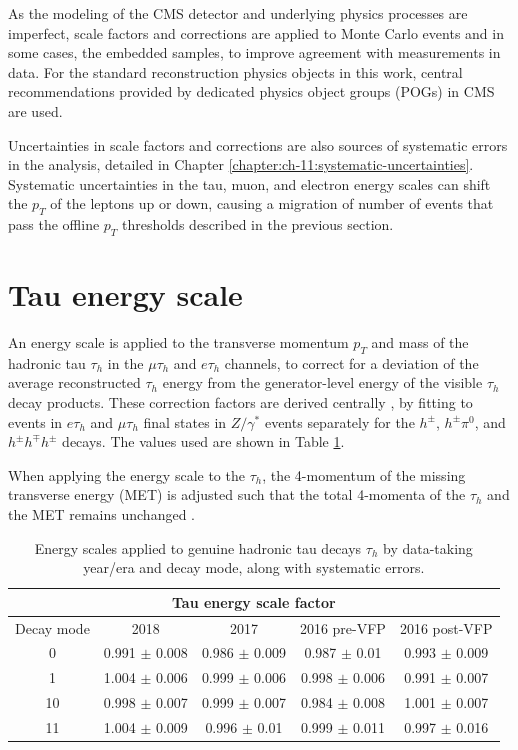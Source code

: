 As the modeling of the CMS detector and underlying physics processes are imperfect, scale factors and corrections are applied to Monte Carlo events and in some cases, the embedded samples, to improve agreement with measurements in data. For the standard reconstruction physics objects in this work, central recommendations provided by dedicated physics object groups (POGs) in CMS are used.

Uncertainties in scale factors and corrections are also sources of systematic errors in the analysis, detailed in Chapter \ref{chapter:ch-11:systematic-uncertainties}. Systematic uncertainties in the tau, muon, and electron energy scales can shift the $p_{T}$ of the leptons up or down, causing a migration of number of events that pass the offline $p_{T}$ thresholds described in the previous section.

\section{Tau energy scale}

An energy scale is applied to the transverse momentum $p_{T}$ and mass of the hadronic tau $\tau_{h}$ in the $\mu\tau_{h}$ and $e\tau_{h}$ channels, to correct for a deviation of the average reconstructed $\tau_{h}$ energy from the generator-level energy of the visible $\tau_{h}$ decay products. These correction factors are derived centrally \cite{CMS-TAU-16-003}, by fitting to events in $e\tau_{h}$ and $\mu\tau_{h}$ final states in $Z/\gamma^*$ events separately for the $h^\pm$, $h^\pm \pi^0$, and $h^\pm h^\mp h^\pm$ decays. The values used are shown in Table \ref{table:tau-ES}.

When applying the energy scale to the $\tau_{h}$, the 4-momentum of the missing transverse energy (MET) is adjusted such that the total 4-momenta of the $\tau_{h}$ and the MET remains unchanged \cite{twiki_TAU_POG_tauidrecommendationforrun2}.

\begin{table}[ht]
    \centering
    \begin{tabular}{|c|c|c|c|c|}
    \hline
    \multicolumn{5}{|c|}{Tau energy scale factor}                                   \\ \hline
    \hline
    Decay mode      & 2018              & 2017              & 2016 pre-VFP      & 2016 post-VFP     \\ \hline
    0               & 0.991 $\pm$ 0.008 & 0.986 $\pm$ 0.009 & 0.987 $\pm$ 0.01  & 0.993 $\pm$ 0.009 \\
    1               & 1.004 $\pm$ 0.006 & 0.999 $\pm$ 0.006 & 0.998 $\pm$ 0.006 & 0.991 $\pm$ 0.007 \\
    10              & 0.998 $\pm$ 0.007 & 0.999 $\pm$ 0.007 & 0.984 $\pm$ 0.008 & 1.001 $\pm$ 0.007 \\
    11              & 1.004 $\pm$ 0.009 & 0.996 $\pm$ 0.01  & 0.999 $\pm$ 0.011 & 0.997 $\pm$ 0.016 \\ \hline
    \end{tabular}
    \caption{Energy scales applied to genuine hadronic tau decays $\tau_{h}$ by data-taking year/era and decay mode, along with systematic errors.}
    \label{table:tau-ES}
\end{table}

